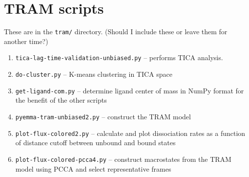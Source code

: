 \documentclass{article}      %
\begin{document}
\section{TRAM scripts}

These are in the \verb+tram/+ directory.   (Should I include these or leave them for another time?)
\begin{enumerate} 
\item \verb+tica-lag-time-validation-unbiased.py+ -- performs TICA analysis. \\
\item \verb+do-cluster.py+ -- K-means clustering in TICA space \\
\item \verb+get-ligand-com.py+ -- determine ligand center of mass in NumPy format for the benefit of the other scripts \\
\item \verb+pyemma-tram-unbiased2.py+ -- construct the TRAM model \\
\item \verb+plot-flux-colored2.py+ -- calculate  and plot dissociation rates as a function of distance cutoff between unbound and bound states \\
\item \verb+plot-flux-colored-pcca4.py+ -- construct macrostates from the TRAM model using PCCA and select representative frames
\end{enumerate}
\end{document}
